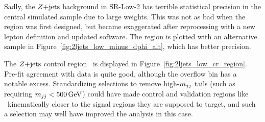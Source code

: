 Sadly, the $\zjets$ background in SR-Low-2 has terrible statistical precision
in the central simulated sample due to large weights.
This was not as bad when the region was first designed, but became exaggerated
after reprocessing with a new lepton definition and updated software.
The region is plotted with an alternative sample in
Figure~\ref{fig:2ljets_low_minus_dphi_alt}, which has better precision.

The $\zjets$ control region \crz\ is displayed in
Figure~\ref{fig:2ljets_low_cr_region}.
Pre-fit agreement with data is quite good, although the overflow bin has a
notable excess.
Standardizing selections to remove high-$\mjj$ tails (such as requiring
$\mjj < 500\,\eV[G]$) could have made control and validation regions like \crz\
kinematically closer to the signal regions they are supposed to target,
and such a selection may well have improved the analysis in this case.

